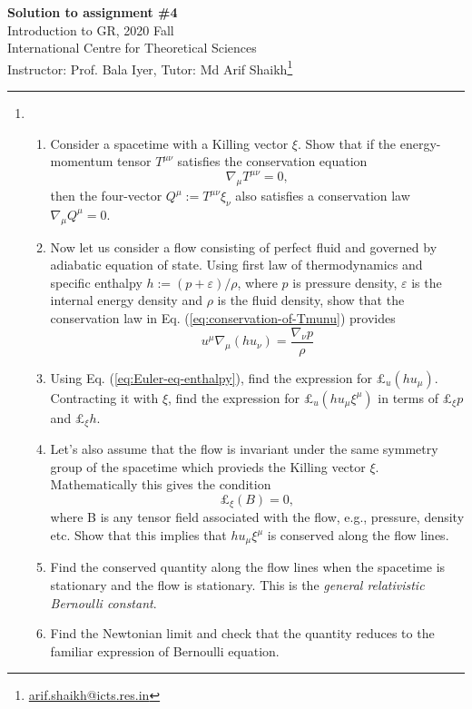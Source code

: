 \documentclass{article}
\begin{document}
\begin{center}
  {\bfseries Solution to assignment \#4}\\
  Introduction to GR, 2020 Fall\\
  International Centre for Theoretical Sciences\\
  Instructor: Prof. Bala Iyer, Tutor: Md Arif Shaikh\footnote{\href{mailto: arif.shaikh@icts.res.in}{arif.shaikh@icts.res.in}}\\
\end{center}
\hrule

\begin{enumerate}
\item[4.]
  \begin{enumerate}
  \item Consider a spacetime with a Killing vector $\xi$. Show that if
    the energy-momentum tensor $T^{\mu\nu}$ satisfies the conservation
    equation
    \begin{equation}
      \label{eq:conservation-of-Tmunu}
      \nabla_\mu T^{\mu\nu} = 0,
    \end{equation}
    then the four-vector $Q^\mu := T^{\mu\nu}\xi_\nu$ also satisfies a conservation law $\nabla_\mu Q^\mu = 0$.
  \item Now let us consider a flow consisting of perfect fluid and governed by adiabatic equation of state. Using first law of thermodynamics and specific enthalpy $h := (p + \varepsilon)/\rho$, where $p$ is pressure density, $\varepsilon$ is the internal energy density and $\rho$ is the fluid density, show that the conservation law in Eq. (\ref{eq:conservation-of-Tmunu}) provides
    \begin{equation}
      \label{eq:Euler-eq-enthalpy}
      u^\mu \nabla_\mu (h u_\nu) = \frac{\nabla_\nu p}{\rho}
    \end{equation}
  \item Using Eq. (\ref{eq:Euler-eq-enthalpy}), find the expression for $\pounds_u(hu_\mu)$. Contracting it with $\xi$, find the expression for $\pounds_u(hu_\mu \xi^\mu)$ in terms of $\pounds_\xi p$ and $\pounds_\xi h$.
  \item 
    Let's also assume that the flow is invariant under the same symmetry group of the spacetime which provieds the Killing vector $\xi$. Mathematically this gives the condition
    \begin{equation}
      \label{eq:symmetry-of-flow}
      \pounds_\xi(B) = 0,
    \end{equation}
    where B is any tensor field associated with the flow, e.g., pressure, density etc. Show that this implies that $h u_\mu \xi^\mu$ is conserved along the flow lines.
  \item Find the conserved quantity along the flow lines when the spacetime is stationary and the flow is stationary. This is the {\itshape general relativistic Bernoulli constant}.
  \item Find the Newtonian limit and check that the quantity reduces to the familiar expression of Bernoulli equation.
\end{enumerate}


\end{enumerate}
\end{document}
